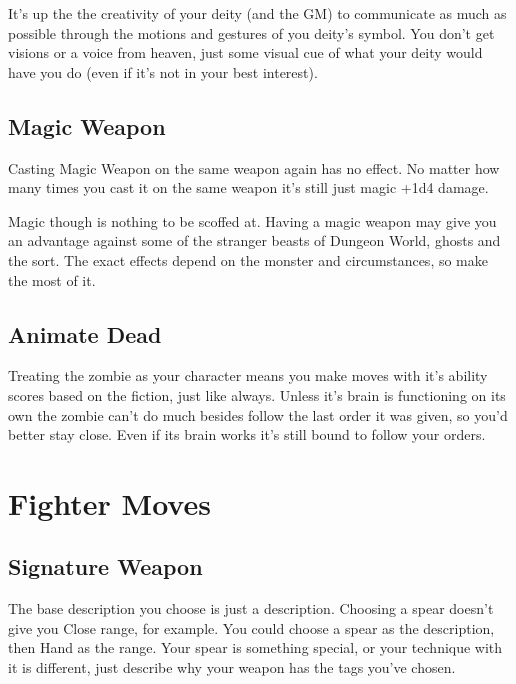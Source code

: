 It's up the the creativity of your deity (and the GM) to communicate as much as possible through the motions and gestures of you deity's symbol. You don't get visions or a voice from heaven, just some visual cue of what your deity would have you do (even if it's not in your best interest).

       
\subsection{Magic Weapon}    
       

Casting Magic Weapon on the same weapon again has no effect. No matter how many times you cast it on the same weapon it's still just magic +1d4 damage.

       

Magic though is nothing to be scoffed at. Having a magic weapon may give you an advantage against some of the stranger beasts of Dungeon World, ghosts and the sort. The exact effects depend on the monster and circumstances, so make the most of it.

       
\subsection{Animate Dead}    
       

Treating the zombie as your character means you make moves with it's ability scores based on the fiction, just like always. Unless it's brain is functioning on its own the zombie can't do much besides follow the last order it was given, so you'd better stay close. Even if its brain works it's still bound to follow your orders.

       
\section{Fighter Moves}    
       
\subsection{Signature Weapon}    
       

The base description you choose is just a description. Choosing a spear doesn't give you Close range, for example. You could choose a spear as the description, then Hand as the range. Your spear is something special, or your technique with it is different, just describe why your weapon has the tags you've chosen.

